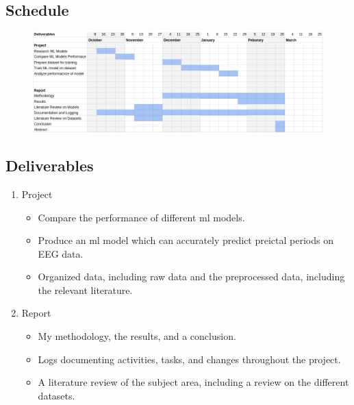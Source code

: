 \documentclass[12pt]{article}
\begin{document}
\subsection{Schedule}

\begin{figure}[H]
\includegraphics[width=\textwidth]{gantt_2}
\centering
\end{figure}


\subsection{Deliverables}

\begin{enumerate}
\item Project
\begin{itemize}
	\item Compare the performance of different \acrshort{ml} models.
	\item Produce an \acrshort{ml} model which can accurately predict preictal periods on EEG data.
	\item Organized data, including raw data and the preprocessed data, including the relevant literature.
\end{itemize}

\item Report
\begin{itemize}
    \item My methodology, the results, and a conclusion.
    \item Logs documenting activities, tasks, and changes throughout the project.
    \item A literature review of the subject area, including a review on the different datasets.
\end{itemize}

\end{enumerate}





\pagebreak

\printglossary[type=\acronymtype]
\printglossary

\pagebreak



\end{document}
